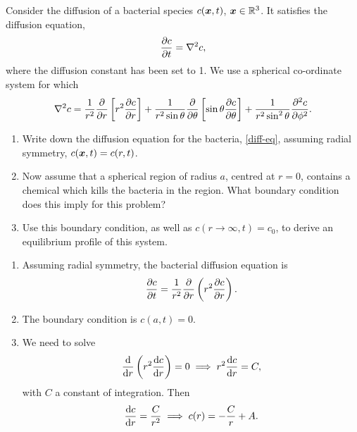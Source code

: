 \documentclass[a4paper, 12pt]{article}
\begin{document}
\begin{enumerate}[label={\bf \arabic{*}.\;}, ref={\arabic{*}},itemsep=3ex, left=0ex]
    {
      Consider the diffusion of a bacterial species $c(\v{x},t)$, $\v{x}\in\mathbb{R}^3$. It satisfies the diffusion equation,
      \begin{equation}
        \label{diff-eq}
        \pd{c}{t} = \nabla^2 c,
      \end{equation}
      where the diffusion constant has been set to 1. We use a spherical co-ordinate system for which
      \begin{equation}
        \nabla^2 c = \frac{1}{r^2}\pd{}{r}\left[r^2\pd{c}{r}\right] +\frac{1}{r^2\sin\theta}\pd{}{\theta}\left[\sin\theta\pd{c}{\theta}\right] + \frac{1}{r^2\sin^2\theta}\pdd{c}{\phi}.
      \end{equation}
      \begin{enumerate}[label=(\alph*)]
        \item Write down the diffusion equation for the bacteria, \cref{diff-eq}, assuming radial symmetry, $c(\v{x},t) = c(r,t)$.
        \item Now assume that a spherical region of radius $a$, centred at $r=0$, contains a chemical which kills the bacteria in  the region. What boundary condition does this imply for this problem?
        \item Use this boundary condition, as well as $c(r\rightarrow \infty,t) = c_0$, to derive an equilibrium profile of this system.
      \end{enumerate}
    }
    {
      \begin{enumerate}[label=(\alph*)]
        \item{Assuming radial symmetry, the bacterial diffusion equation is
            \begin{equation}
              \pd{c}{t} = \frac{1}{r^2}\pd{}{r}\left(r^2\pd{c}{r}\right).
            \end{equation}
          }
        \item{The boundary condition is $c(a,t) = 0$.
          }
        \item{We need to solve
            \begin{equation}
              \fd{}{r}\left(r^2\fd{c}{r}\right) = 0 \implies r^2\fd{c}{r} = C,
            \end{equation}
            with $C$ a constant of integration. Then
            \begin{equation}
              \fd{c}{r} = \frac{C}{r^2} \implies c(r)=  -\frac{C}{r} + A.
            \end{equation}
}
\end{enumerate}}
\end{enumerate}
\end{document}
